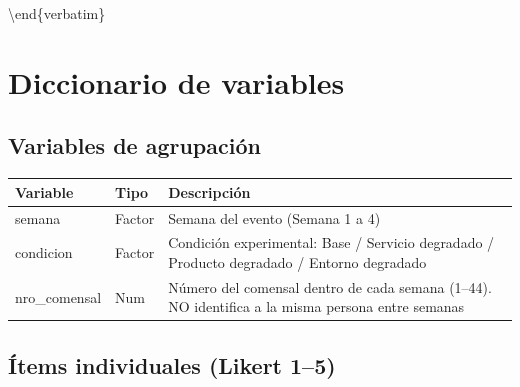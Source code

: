 \documentclass[
  spanish,
]{article}
\newenvironment{Shaded}{\begin{snugshade}}{\end{snugshade}}
\newcommand{\NormalTok}[1]{#1}
\begin{document}
\begin{Shaded}
\begin{Highlighting}[]

\NormalTok{\textbackslash{}end\{verbatim\}}
\end{Highlighting}
\end{Shaded}

\section{Diccionario de variables}\label{diccionario-de-variables}

\subsection{Variables de agrupación}\label{variables-de-agrupaciuxf3n}

\begin{table}[!h]
\centering
\begin{tabular}{ll>{\raggedright\arraybackslash}p{9cm}}
\toprule
Variable & Tipo & Descripción\\
\midrule
semana & Factor & Semana del evento (Semana 1 a 4)\\
condicion & Factor & Condición experimental: Base / Servicio degradado / Producto degradado / Entorno degradado\\
nro\_comensal & Num & Número del comensal dentro de cada semana (1--44). NO identifica a la misma persona entre semanas\\
\bottomrule
\end{tabular}
\end{table}

\subsection{Ítems individuales (Likert
1--5)}\label{uxedtems-individuales-likert-15}
\end{document}
